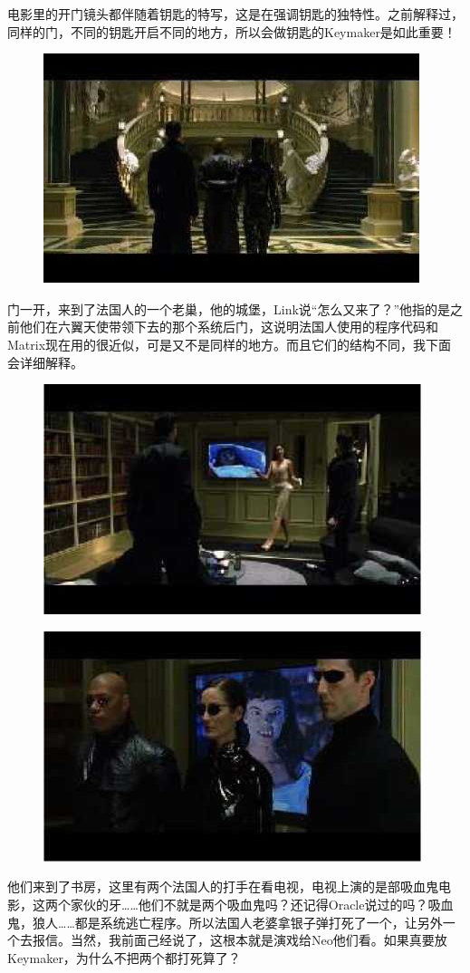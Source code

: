 \documentclass{ctexart}
\begin{document}
电影里的开门镜头都伴随着钥匙的特写，这是在强调钥匙的独特性。之前解释过，同样的门，不同的钥匙开启不同的地方，所以会做钥匙的Keymaker是如此重要！

\begin{figure}[htb]
\centering
\includegraphics[width=0.5\linewidth]{fig/read_reloaded-111-1}
\end{figure}

门一开，来到了法国人的一个老巢，他的城堡，Link说“怎么又来了？”他指的是之前他们在六翼天使带领下去的那个系统后门，这说明法国人使用的程序代码和Matrix现在用的很近似，可是又不是同样的地方。而且它们的结构不同，我下面会详细解释。

\begin{figure}[htb]
\centering
\includegraphics[width=0.5\linewidth]{fig/read_reloaded-112}
\end{figure}

\begin{figure}[!htb]
\centering
\includegraphics[width=0.5\linewidth]{fig/read_reloaded-113}
\end{figure}

他们来到了书房，这里有两个法国人的打手在看电视，电视上演的是部吸血鬼电影，这两个家伙的牙……他们不就是两个吸血鬼吗？还记得Oracle说过的吗？吸血鬼，狼人……都是系统逃亡程序。所以法国人老婆拿银子弹打死了一个，让另外一个去报信。当然，我前面己经说了，这根本就是演戏给Neo他们看。如果真要放Keymaker，为什么不把两个都打死算了？
\end{document}
